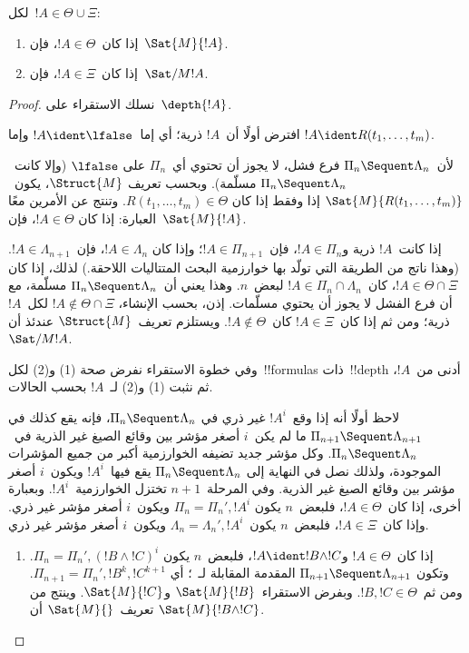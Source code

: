 \documentclass[../../../include/open-logic-section]{subfiles}
\begin{document}
\begin{lem}
لكل~$!A\in\Theta\cup\Xi$:
\begin{enumerate}
  \item إذا كان~$!A\in\Theta$، فإن~$\Sat{M}{!A}$.
  \item إذا كان~$!A\in\Xi$، فإن~$\Sat/{M}{!A}$.
\end{enumerate}
\end{lem}

\begin{proof}
  نسلك الاستقراء على~$\depth{!A}$.

افترض أولًا أن~$!A$ ذرية؛ أي إما~$!A\ident\lfalse$ وإما
$!A\ident R(t_1,\dots,t_m)$.

لأن~$\Pi_n \Sequent \Lambda_n$ فرع فشل، لا يجوز أن تحتوي أي~$\Pi_n$ على
$\lfalse$ (وإلا كانت~$\Pi_n \Sequent \Lambda_n$ مسلّمة). وبحسب تعريف
$\Struct{M}$، يكون~$\Sat{M}{R(t_1,\dots,t_m)}$ إذا وفقط إذا كان
$R(t_1,\dots,t_m)\in\Theta$. وتنتج عن الأمرين معًا العبارة: إذا كان
$!A\in\Theta$، فإن~$\Sat{M}{!A}$.

إذا كانت~$!A$ ذرية و$!A\in\Pi_n$، فإن~$!A\in\Pi_{n+1}$؛ وإذا كان
$!A\in\Lambda_n$، فإن~$!A\in\Lambda_{n+1}$. (وهذا ناتج من الطريقة التي
تولّد بها خوارزمية البحث المتتاليات اللاحقة.) لذلك، إذا كان
$!A\in\Theta\cap\Xi$، كان~$!A\in\Pi_n\cap\Lambda_n$ لبعض~$n$. وهذا يعني
أن~$\Pi_n \Sequent \Lambda_n$ مسلّمة، مع أن فرع الفشل لا يجوز أن يحتوي
مسلّمات. إذن، بحسب الإنشاء، $!A\notin\Theta\cap\Xi$ لكل~$!A$ ذرية؛ ومن ثم
إذا كان~$!A\in\Xi$ كان~$!A\notin\Theta$. ويستلزم تعريف~$\Struct{M}$ عندئذ
أن~$\Sat/{M}{!A}$.

وفي خطوة الاستقراء نفرض صحة (1) و(2) لكل~!!{formula}s ذات~!!{depth}
أدنى من~$!A$، ثم نثبت (1) و(2) لـ~$!A$ بحسب الحالات.

لاحظ أولًا أنه إذا وقع~$!A^i$ غير ذري في
$\Pi_n \Sequent \Lambda_n$، فإنه يقع كذلك في
$\Pi_{n+1} \Sequent \Lambda_{n+1}$ ما لم يكن~$i$ أصغر مؤشر بين وقائع
الصيغ غير الذرية في~$\Pi_n \Sequent \Lambda_n$. وكل مؤشر جديد تضيفه
الخوارزمية أكبر من جميع المؤشرات الموجودة، ولذلك نصل في النهاية إلى
$\Pi_n \Sequent \Lambda_n$ يقع فيها~$!A^i$ ويكون~$i$ أصغر مؤشر بين
وقائع الصيغ غير الذرية. وفي المرحلة~$n+1$ تختزل الخوارزمية~$!A^i$.
وبعبارة أخرى، إذا كان~$!A\in\Theta$، فلبعض~$n$ يكون
$\Pi_n=\Pi_n',!A^i$ ويكون~$i$ أصغر مؤشر غير ذري. وإذا كان~$!A\in\Xi$،
فلبعض~$n$ يكون~$\Lambda_n=\Lambda_n',!A^i$ ويكون~$i$ أصغر مؤشر غير ذري.

\begin{enumerate}
  \item إذا كان~$!A\in\Theta$ و$!A\ident !B\land !C$، فلبعض~$n$ يكون
  $\Pi_n=\Pi_n',(!B\land !C)^i$. وتكون
  $\Pi_{n+1}\Sequent\Lambda_{n+1}$ المقدمة المقابلة لـ~\LeftR{\land}؛ أي
  $\Pi_{n+1}=\Pi_n',!B^k,!C^{k+1}$. ومن ثم~$!B,!C\in\Theta$. وبفرض
  الاستقراء~$\Sat{M}{!B}$ و$\Sat{M}{!C}$. وينتج من تعريف~$\Sat{M}{}$ أن
  $\Sat{M}{!B\land !C}$.


\end{enumerate}
\end{proof}
\end{document}
